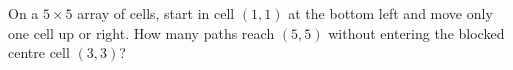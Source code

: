 On a $5\times5$ array of cells, start in cell $(1,1)$ at the bottom left and move only one cell up or right. How many paths reach $(5,5)$ without entering the blocked centre cell $(3,3)$?
